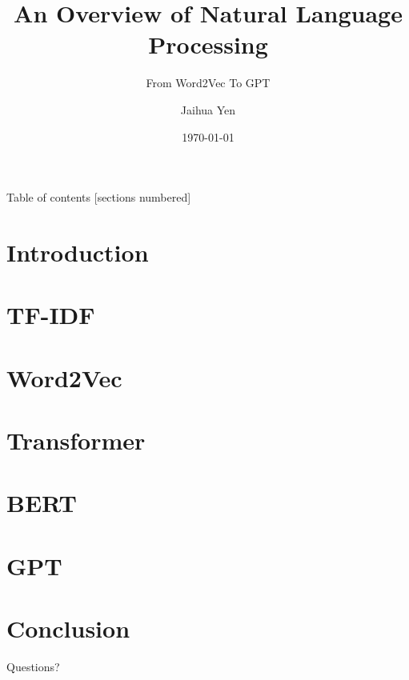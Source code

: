 \documentclass[10pt]{beamer}
\title{An Overview of Natural Language Processing}
\subtitle{From Word2Vec To GPT}
\date{\today}
\author{Jaihua Yen}
\institute{QNAP}
\begin{document}
\maketitle

\begin{frame}{Table of contents}
    [sections numbered]
    \tableofcontents%
\end{frame}

\section{Introduction}



\section{TF-IDF}



\section{Word2Vec}



\section{Transformer}



\section{BERT}



\section{GPT}



\section{Conclusion}



\appendix


\begin{frame}[standout]
    Questions?
\end{frame}


\end{document}
